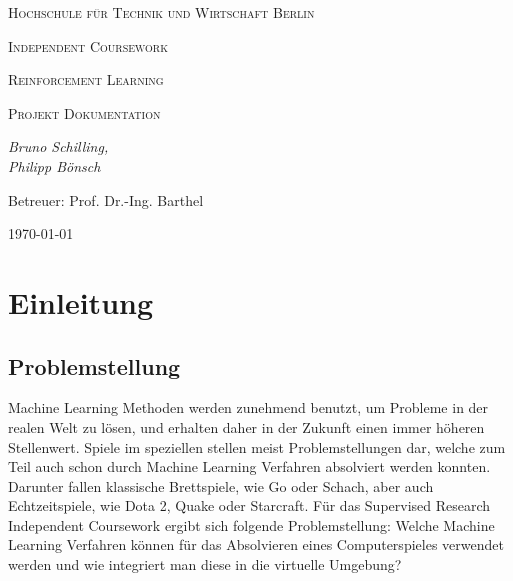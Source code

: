 \documentclass[11pt]{scrartcl}
\begin{document}

\begin{titlepage}
	\centering
	{\scshape\LARGE Hochschule für Technik und Wirtschaft Berlin \par}
	\vspace{2cm}
	{\Huge \scshape{Independent Coursework}\par}
	\vspace{2cm}
	{\LARGE \scshape{Reinforcement Learning}\par}
	{\scshape\Large Projekt Dokumentation\par}
	\vspace{4cm}
	{\large\itshape Bruno Schilling,\\Philipp Bönsch\par}
	\vfill
	
	{\large Betreuer: Prof. Dr.-Ing. Barthel \par}
	\vspace{1cm}
	{\large \today\par}
\end{titlepage}

\lstset{basicstyle=\ttfamily\small,breaklines=true}
\newpage
\tableofcontents
\newpage
\section{Einleitung}

\subsection{Problemstellung}
Machine Learning Methoden werden zunehmend benutzt, um Probleme in der realen Welt zu
lösen, und erhalten daher in der Zukunft einen immer höheren Stellenwert. Spiele im
speziellen stellen meist Problemstellungen dar, welche zum Teil auch schon durch Machine
Learning Verfahren absolviert werden konnten. Darunter fallen klassische Brettspiele, wie Go
oder Schach\cite{DM2018}, aber auch Echtzeitspiele, wie Dota 2\cite{OA2019},
Quake\cite{DM2019} oder Starcraft\cite{DM2019_2}. Für das Supervised Research Independent Coursework
ergibt sich folgende Problemstellung: Welche Machine Learning Verfahren können für das
Absolvieren eines Computerspieles verwendet werden und wie integriert man diese in die
virtuelle Umgebung?
\end{document}
